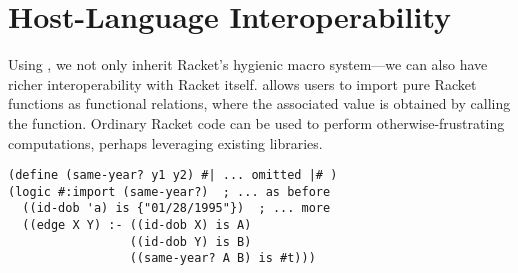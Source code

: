 \documentclass[dvipsnames,sigplan,screen,review,anonymous,acmthm,nonacm]{acmart}
\begin{document}
\begin{figure}[h]
  \begin{center}
  \end{center}
\end{figure}

\section{Host-Language Interoperability}


Using \syntaxspec{}, we not only inherit Racket's hygienic macro system---we can
also have richer interoperability with Racket itself. \miniDusa{} allows users
to import pure Racket functions as functional relations, where the
associated value is obtained by calling the function. Ordinary Racket code can
be used to perform otherwise-frustrating computations, perhaps leveraging
existing libraries.

\begin{verbatim}
(define (same-year? y1 y2) #| ... omitted |# )
(logic #:import (same-year?)  ; ... as before
  ((id-dob 'a) is {"01/28/1995"})  ; ... more
  ((edge X Y) :- ((id-dob X) is A)
                 ((id-dob Y) is B)
                 ((same-year? A B) is #t)))
\end{verbatim}
\end{document}
